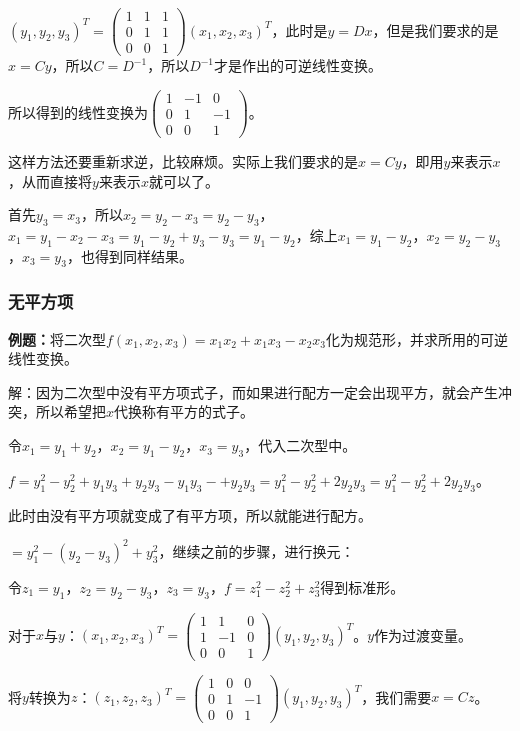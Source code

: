 $(y_1,y_2,y_3)^T=\left(\begin{array}{ccc}
    1 & 1 & 1 \\
    0 & 1 & 1 \\
    0 & 0 & 1
\end{array}\right)(x_1,x_2,x_3)^T$，此时是$y=Dx$，但是我们要求的是$x=Cy$，所以$C=D^{-1}$，所以$D^{-1}$才是作出的可逆线性变换。

所以得到的线性变换为$\left(\begin{array}{ccc}
    1 & -1 & 0 \\
    0 & 1 & -1 \\
    0 & 0 & 1
\end{array}\right)$。

这样方法还要重新求逆，比较麻烦。实际上我们要求的是$x=Cy$，即用$y$来表示$x$，从而直接将$y$来表示$x$就可以了。

首先$y_3=x_3$，所以$x_2=y_2-x_3=y_2-y_3$，$x_1=y_1-x_2-x_3=y_1-y_2+y_3-y_3=y_1-y_2$，综上$x_1=y_1-y_2$，$x_2=y_2-y_3$，$x_3=y_3$，也得到同样结果。

\subsubsection{无平方项}

\textbf{例题：}将二次型$f(x_1,x_2,x_3)=x_1x_2+x_1x_3-x_2x_3$化为规范形，并求所用的可逆线性变换。

解：因为二次型中没有平方项式子，而如果进行配方一定会出现平方，就会产生冲突，所以希望把$x$代换称有平方的式子。

令$x_1=y_1+y_2$，$x_2=y_1-y_2$，$x_3=y_3$，代入二次型中。

$f=y_1^2-y_2^2+y_1y_3+y_2y_3-y_1y_3-+y_2y_3=y_1^2-y_2^2+2y_2y_3=y_1^2-y_2^2+2y_2y_3$。

此时由没有平方项就变成了有平方项，所以就能进行配方。

$=y_1^2-(y_2-y_3)^2+y_3^2$，继续之前的步骤，进行换元：

令$z_1=y_1$，$z_2=y_2-y_3$，$z_3=y_3$，$f=z_1^2-z_2^2+z_3^2$得到标准形。

对于$x$与$y$：$(x_1,x_2,x_3)^T=\left(\begin{array}{ccc}
    1 & 1 & 0 \\
    1 & -1 & 0 \\
    0 & 0 & 1
\end{array}\right)(y_1,y_2,y_3)^T$。$y$作为过渡变量。

将$y$转换为$z$：$(z_1,z_2,z_3)^T=\left(\begin{array}{ccc}
    1 & 0 & 0 \\
    0 & 1 & -1 \\
    0 & 0 & 1
\end{array}\right)(y_1,y_2,y_3)^T$，我们需要$x=Cz$。

